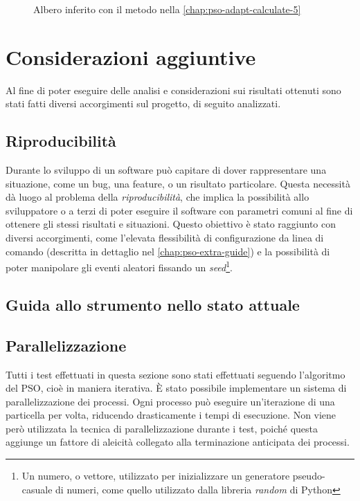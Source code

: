 \begin{figure}[!h]
  \centering
  \caption{Albero inferito con il metodo nella \autoref{chap:pso-adapt-calculate-5}}
  \label{fig:pso-adapt-calculate-5-tree}
\end{figure}

\section{Considerazioni aggiuntive}
\label{chap:pso-extra}
Al fine di poter eseguire delle analisi e considerazioni sui risultati ottenuti sono stati fatti diversi accorgimenti sul progetto, di seguito analizzati.

\subsection{Riproducibilità}
\label{chap:pso-extra-ripro}
Durante lo sviluppo di un software può capitare di dover rappresentare una situazione, come un bug, una feature, o un risultato particolare. Questa necessità dà luogo al problema della \textit{riproducibilità}, che implica la possibilità allo sviluppatore o a terzi di poter eseguire il software con parametri comuni al fine di ottenere gli stessi risultati e situazioni. Questo obiettivo è stato raggiunto con diversi accorgimenti, come l'elevata flessibilità di configurazione da linea di comando (descritta in dettaglio nel \autoref{chap:pso-extra-guide}) e la possibilità di poter manipolare gli eventi aleatori fissando un \textit{seed}\footnote{Un numero, o vettore, utilizzato per inizializzare un generatore pseudo-casuale di numeri, come quello utilizzato dalla libreria \textit{random} di Python}.

\subsection{Guida allo strumento nello stato attuale}
\label{chap:pso-extra-guide}

\subsection{Parallelizzazione}
\label{chap:pso-extra-paral}
Tutti i test effettuati in questa sezione sono stati effettuati seguendo l'algoritmo del PSO, cioè in maniera iterativa. È stato possibile implementare un sistema di parallelizzazione dei processi. Ogni processo può eseguire un'iterazione di una particella per volta, riducendo drasticamente i tempi di esecuzione.
Non viene però utilizzata la tecnica di parallelizzazione durante i test, poiché questa aggiunge un fattore di aleicità collegato alla terminazione anticipata dei processi.